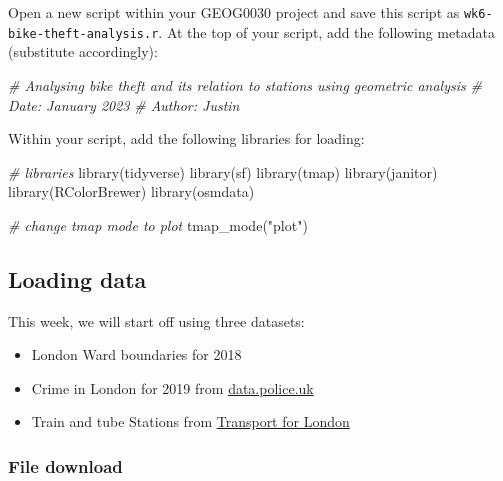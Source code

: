 \documentclass[
]{book}
\newenvironment{Shaded}{\begin{snugshade}}{\end{snugshade}}
\newcommand{\CommentTok}[1]{\textcolor[rgb]{0.56,0.35,0.01}{\textit{#1}}}
\newcommand{\FunctionTok}[1]{\textcolor[rgb]{0.00,0.00,0.00}{#1}}
\newcommand{\NormalTok}[1]{#1}
\newcommand{\StringTok}[1]{\textcolor[rgb]{0.31,0.60,0.02}{#1}}
\providecommand{\tightlist}{%
  \setlength{\itemsep}{0pt}\setlength{\parskip}{0pt}}
\begin{document}
Open a new script within your GEOG0030 project and save this script as \texttt{wk6-bike-theft-analysis.r}. At the top of your script, add the following metadata (substitute accordingly):

\begin{Shaded}
\begin{Highlighting}[]
\CommentTok{\# Analysing bike theft and its relation to stations using geometric analysis}
\CommentTok{\# Date: January 2023}
\CommentTok{\# Author: Justin }
\end{Highlighting}
\end{Shaded}

Within your script, add the following libraries for loading:

\begin{Shaded}
\begin{Highlighting}[]
\CommentTok{\# libraries}
\FunctionTok{library}\NormalTok{(tidyverse)}
\FunctionTok{library}\NormalTok{(sf)}
\FunctionTok{library}\NormalTok{(tmap)}
\FunctionTok{library}\NormalTok{(janitor)}
\FunctionTok{library}\NormalTok{(RColorBrewer)}
\FunctionTok{library}\NormalTok{(osmdata)}
\end{Highlighting}
\end{Shaded}

\begin{Shaded}
\begin{Highlighting}[]
\CommentTok{\# change tmap mode to plot}
\FunctionTok{tmap\_mode}\NormalTok{(}\StringTok{"plot"}\NormalTok{)}
\end{Highlighting}
\end{Shaded}

\hypertarget{loading-data-w06}{%
\subsection{Loading data}\label{loading-data-w06}}

This week, we will start off using three datasets:

\begin{itemize}
\tightlist
\item
  London Ward boundaries for 2018
\item
  Crime in London for 2019 from \href{https://data.police.uk/}{data.police.uk}
\item
  Train and tube Stations from \href{https://tfl.gov.uk/}{Transport for London}
\end{itemize}

\hypertarget{file-download-1}{%
\subsubsection*{File download}\label{file-download-1}}
\end{document}
